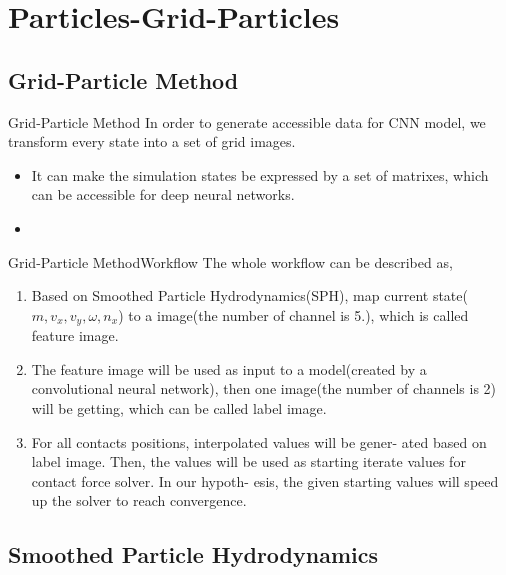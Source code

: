 \documentclass{beamer}
\begin{document}
\section{Particles-Grid-Particles}

\subsection{Grid-Particle Method}
\begin{frame}{Grid-Particle Method}
In order to generate accessible data for CNN model, we transform every state into a set of grid images.
\begin{itemize}
\item {It can make the simulation states be expressed by a set of matrixes, which can be accessible for deep neural networks.
    \pause
}
\item {}
\end{itemize}
\end{frame}
\begin{frame}{Grid-Particle Method}{Workflow}
The whole workflow can be described as,
\begin{enumerate}
\item {
Based on Smoothed Particle Hydrodynamics(SPH), map current state(\(m, v_x, v_y, \omega, n_x\)) to a image(the number of channel is 5.), which is called feature image.
\pause
}
\item {
The feature image will be used as input to a model(created by a convolutional neural network), then one image(the number of channels is 2) will be getting, which can be called label image.
\pause
}
\item {
For all contacts positions, interpolated values will be gener- ated based on label image. Then, the values will be used as starting iterate values for contact force solver. In our hypoth- esis, the given starting values will speed up the solver to reach convergence.
}

\end{enumerate}
\end{frame}
\subsection{Smoothed Particle Hydrodynamics}
\end{document}
